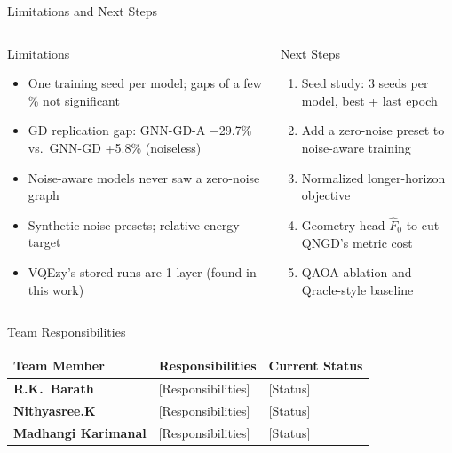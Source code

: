 \documentclass[aspectratio=169,11pt]{beamer}
\begin{document}
\begin{frame}{Limitations and Next Steps}
  \begin{columns}[T,onlytextwidth]
    \begin{alertblock}{Limitations}
      \begin{itemize}\scriptsize
        \item One training seed per model; gaps of a few \% not significant
        \item GD replication gap: GNN-GD-A $-$29.7\% vs.\ GNN-GD +5.8\% (noiseless)
        \item Noise-aware models never saw a zero-noise graph
        \item Synthetic noise presets; relative energy target
        \item VQEzy's stored runs are 1-layer (found in this work)
      \end{itemize}
    \end{alertblock}
    \begin{block}{Next Steps}
      \begin{enumerate}\scriptsize
        \item Seed study: 3 seeds per model, best + last epoch
        \item Add a zero-noise preset to noise-aware training
        \item Normalized longer-horizon objective
        \item Geometry head $\hat F_0$ to cut QNGD's metric cost
        \item QAOA ablation and Qracle-style baseline
      \end{enumerate}
    \end{block}
  \end{columns}
\end{frame}

\begin{frame}{Team Responsibilities}
  \small
  \begin{tabularx}{\textwidth}{>{\bfseries}p{3.6cm}X p{2.3cm}}
    \toprule
    Team Member & Responsibilities & Current Status \\
    \midrule
    R.K.\ Barath & [Responsibilities] & [Status] \\
    Nithyasree.K & [Responsibilities] & [Status] \\
    Madhangi Karimanal & [Responsibilities] & [Status] \\
    \bottomrule
  \end{tabularx}
\end{frame}
\end{document}
